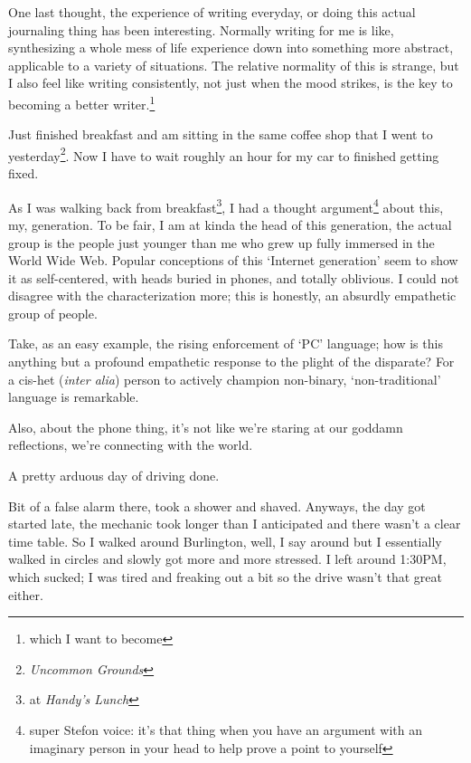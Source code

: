 \documentclass[../butidigress.tex]{subfiles}
\begin{document}
One last thought, the experience of writing everyday, or doing this actual journaling thing has been interesting.
Normally writing for me is like, synthesizing a whole mess of life experience down into something more abstract, applicable to a variety of situations.
The relative normality of this is strange, but I also feel like writing consistently, not just when the mood strikes, is the key to becoming a better writer.\footnote{which I want to become}

\vspace*{\baselineskip}

Just finished breakfast and am sitting in the same coffee shop that I went to yesterday\footnote{\textit{Uncommon Grounds}}.
Now I have to wait roughly an hour for my car to finished getting fixed.

As I was walking back from breakfast\footnote{at \textit{Handy's Lunch}}, I had a thought argument\footnote{super Stefon voice: it's that thing when you have an argument with an imaginary person in your head to help prove a point to yourself} about this, my, generation.
To be fair, I am at kinda the head of this generation, the actual group is the people just younger than me who grew up fully immersed in the World Wide Web.
Popular conceptions of this `Internet generation' seem to show it as self-centered, with heads buried in phones, and totally oblivious.
I could not disagree with the characterization more; this is honestly, an absurdly empathetic group of people.

Take, as an easy example, the rising enforcement of `PC' language; how is this anything but a profound empathetic response to the plight of the disparate?
For a cis-het (\textit{inter alia}) person to actively champion non-binary, `non-traditional' language is remarkable.

Also, about the phone thing, it's not like we're staring at our goddamn reflections, we're connecting with the world.

\vspace*{\baselineskip}

A pretty arduous day of driving done.

\vspace*{\baselineskip}

Bit of a false alarm there, took a shower and shaved.
Anyways, the day got started late, the mechanic took longer than I anticipated and there wasn't a clear time table.
So I walked around Burlington, well, I say around but I essentially walked in circles and slowly got more and more stressed.
I left around 1:30PM, which sucked; I was tired and freaking out a bit so the drive wasn't that great either.
\end{document}
